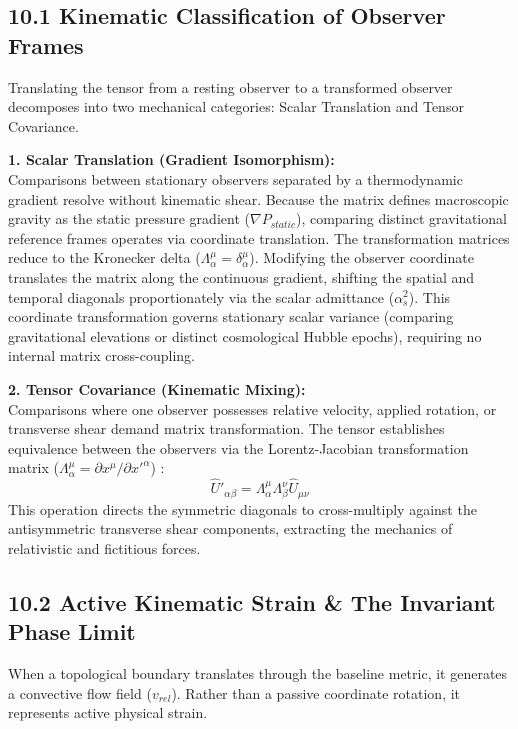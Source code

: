 \subsection*{10.1 Kinematic Classification of Observer Frames}
Translating the tensor from a resting observer to a transformed observer decomposes into two mechanical categories: Scalar Translation and Tensor Covariance.

\textbf{1. Scalar Translation (Gradient Isomorphism):} \\
Comparisons between stationary observers separated by a thermodynamic gradient resolve without kinematic shear. Because the matrix defines macroscopic gravity as the static pressure gradient ($\nabla P_{static}$), comparing distinct gravitational reference frames operates via coordinate translation. The transformation matrices reduce to the Kronecker delta ($\Lambda^\mu_\alpha = \delta^\mu_\alpha$). Modifying the observer coordinate translates the matrix along the continuous gradient, shifting the spatial and temporal diagonals proportionately via the scalar admittance ($\alpha_s^2$). This coordinate transformation governs stationary scalar variance (comparing gravitational elevations or distinct cosmological Hubble epochs), requiring no internal matrix cross-coupling.

\textbf{2. Tensor Covariance (Kinematic Mixing):} \\
Comparisons where one observer possesses relative velocity, applied rotation, or transverse shear demand matrix transformation. The tensor establishes equivalence between the observers via the Lorentz-Jacobian transformation matrix ($\Lambda^\mu_\alpha = \partial x^\mu / \partial x'^\alpha$) \cite{Misner1973}:
\begin{equation}
    \hat{U}'_{\alpha\beta} = \Lambda^\mu_\alpha \Lambda^\nu_\beta \hat{U}_{\mu\nu} \label{eq:tensor_transformation}
\end{equation}
This operation directs the symmetric diagonals to cross-multiply against the antisymmetric transverse shear components, extracting the mechanics of relativistic and fictitious forces. 

\subsection*{10.2 Active Kinematic Strain \& The Invariant Phase Limit}
When a topological boundary translates through the baseline metric, it generates a convective flow field ($v_{rel}$). Rather than a passive coordinate rotation, it represents active physical strain.

